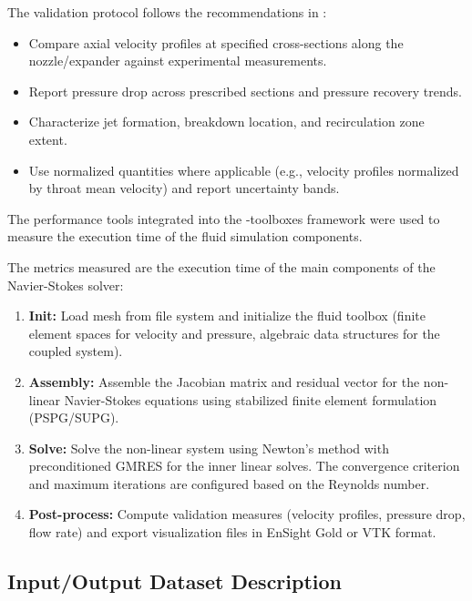 The validation protocol follows the recommendations in \cite{hariharan_multilaboratory_2011,stewart_assessment_2012}:
\begin{itemize}
    \item Compare axial velocity profiles at specified cross-sections along the nozzle/expander against experimental measurements.
    \item Report pressure drop across prescribed sections and pressure recovery trends.
    \item Characterize jet formation, breakdown location, and recirculation zone extent.
    \item Use normalized quantities where applicable (e.g., velocity profiles normalized by throat mean velocity) and report uncertainty bands.
\end{itemize}

The performance tools integrated into the \Feelpp-toolboxes framework were used to measure the execution time of the fluid simulation components.

The metrics measured are the execution time of the main components of the Navier-Stokes solver:
\begin{enumerate}
\item \textbf{Init:} Load mesh from file system and initialize the fluid toolbox (finite element spaces for velocity and pressure, algebraic data structures for the coupled system).
\item \textbf{Assembly:} Assemble the Jacobian matrix and residual vector for the non-linear Navier-Stokes equations using stabilized finite element formulation (PSPG/SUPG).
\item \textbf{Solve:} Solve the non-linear system using Newton's method with preconditioned GMRES for the inner linear solves. The convergence criterion and maximum iterations are configured based on the Reynolds number.
\item \textbf{Post-process:} Compute validation measures (velocity profiles, pressure drop, flow rate) and export visualization files in EnSight Gold or VTK format.
\end{enumerate}





\subsection{Input/Output Dataset Description}


